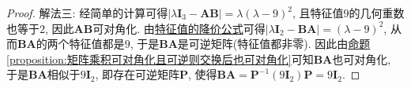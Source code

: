 \documentclass[../../main.tex]{subfiles}%
\begin{document}
\begin{proof}
{\color{blue}解法三:}
经简单的计算可得\(|\lambda\boldsymbol{I}_3 - \boldsymbol{A}\boldsymbol{B}| = \lambda(\lambda - 9)^2\), 且特征值\(9\)的几何重数也等于\(2\), 因此\(\boldsymbol{A}\boldsymbol{B}\)可对角化. 由\hyperref[theorem:特征值的降价公式]{特征值的降价公式}可得\(|\lambda\boldsymbol{I}_2 - \boldsymbol{B}\boldsymbol{A}| = (\lambda - 9)^2\), 从而\(\boldsymbol{B}\boldsymbol{A}\)的两个特征值都是\(9\), 于是\(\boldsymbol{B}\boldsymbol{A}\)是可逆矩阵(特征值都非零). 因此由\hyperref[proposition:矩阵乘积可对角化且可逆则交换后也可对角化]{命题\ref{proposition:矩阵乘积可对角化且可逆则交换后也可对角化}}可知\(\boldsymbol{B}\boldsymbol{A}\)也可对角化, 于是\(\boldsymbol{B}\boldsymbol{A}\)相似于\(9\boldsymbol{I}_2\), 即存在可逆矩阵\(\boldsymbol{P}\), 使得\(\boldsymbol{B}\boldsymbol{A} = \boldsymbol{P}^{-1}(9\boldsymbol{I}_2)\boldsymbol{P} = 9\boldsymbol{I}_2\). 

\end{proof}
\end{document}
